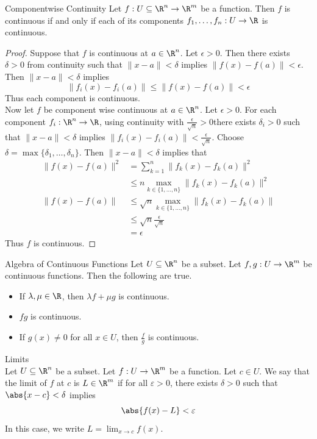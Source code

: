 \documentclass[a4paper]{article}
\begin{document}
\begin{thm}{Componentwise Continuity}{} Let $f:U\subseteq\R^n\to\R^m$ be a function. Then $f$ is continuous if and only if each of its components $f_1,\dots,f_n:U\to\R$ is continuous. 
\begin{proof}
Suppose that $f$ is continuous at $a\in\R^n$. Let $\epsilon>0$. Then there exists $\delta>0$ from continuity such that $\|x-a\|<\delta$ implies $\|f(x)-f(a)\|<\epsilon$. Then $\|x-a\|<\delta$ implies $$\|f_i(x)-f_i(a)\|\leq\|f(x)-f(a)\|<\epsilon$$ Thus each component is continuous. \\
Now let $f$ be component wise continuous at $a\in\R^n$. Let $\epsilon>0$. For each component $f_i:\R^n\to\R$, using continuity with $\frac{\epsilon}{\sqrt{n}}>0$there exists $\delta_i>0$ such that $\|x-a\|<\delta$ implies $\|f_i(x)-f_i(a)\|<\frac{\epsilon}{\sqrt{n}}$. Choose $\delta=\max\{\delta_1,\dots,\delta_n\}$. Then $\|x-a\|<\delta$ implies that 
\begin{align*}
\|f(x)-f(a)\|^2&=\sum_{k=1}^n\|f_k(x)-f_k(a)\|^2\\
&\leq n\max_{k\in\{1,\dots,n\}}\|f_k(x)-f_k(a)\|^2\\
\|f(x)-f(a)\|&\leq\sqrt{n}\max_{k\in\{1,\dots,n\}}\|f_k(x)-f_k(a)\|\\
&\leq\sqrt{n}\frac{\epsilon}{\sqrt{n}}\\
&=\epsilon
\end{align*}
Thus $f$ is continuous. 
\end{proof}
\end{thm}

\begin{prp}{Algebra of Continuous Functions}{} Let $U\subseteq\R^n$ be a subset. Let $f,g:U\to\R^m$ be continuous functions. Then the following are true. 
\begin{itemize}
\item If $\lambda,\mu\in\R$, then $\lambda f+\mu g$ is continuous. 
\item $fg$ is continuous. 
\item If $g(x)\neq 0$ for all $x\in U$, then $\frac{f}{g}$ is continuous. 
\end{itemize}
\end{prp}

\begin{defn}{Limits}{}\\
Let $U\subseteq\R^n$ be a subset. Let $f:U\to\R^m$ be a function. Let $c\in U$. We say that the limit of $f$ at $c$ is $L\in\R^m$ if for all $\varepsilon>0$, there exists $\delta>0$ such that $\abs{x-c}<\delta$ implies $$\abs{f(x)-L}<\varepsilon$$ In this case, we write $L=\lim_{x\to c}f(x)$. 
\end{defn}
\end{document}

